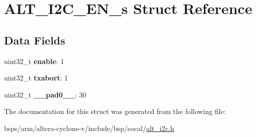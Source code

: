 \hypertarget{structALT__I2C__EN__s}{}\section{A\+L\+T\+\_\+\+I2\+C\+\_\+\+E\+N\+\_\+s Struct Reference}
\label{structALT__I2C__EN__s}
\subsection*{Data Fields}
\begin{DoxyCompactItemize}
\item 
\mbox{\label{structALT__I2C__EN__s_a414ec689cffb15b98537125ae409c532}} 
uint32\+\_\+t {\bfseries enable}\+: 1
\item 
\mbox{\label{structALT__I2C__EN__s_a7d0a2e004be27e9ec57780761fcc7a6d}} 
uint32\+\_\+t {\bfseries txabort}\+: 1
\item 
\mbox{\label{structALT__I2C__EN__s_aed5442c8f706300905383eb178039dc3}} 
uint32\+\_\+t {\bfseries \+\_\+\+\_\+pad0\+\_\+\+\_\+}\+: 30
\end{DoxyCompactItemize}


The documentation for this struct was generated from the following file\+:\begin{DoxyCompactItemize}
\item 
bsps/arm/altera-\/cyclone-\/v/include/bsp/socal/\mbox{\hyperlink{socal_2alt__i2c_8h}{alt\+\_\+i2c.\+h}}\end{DoxyCompactItemize}
